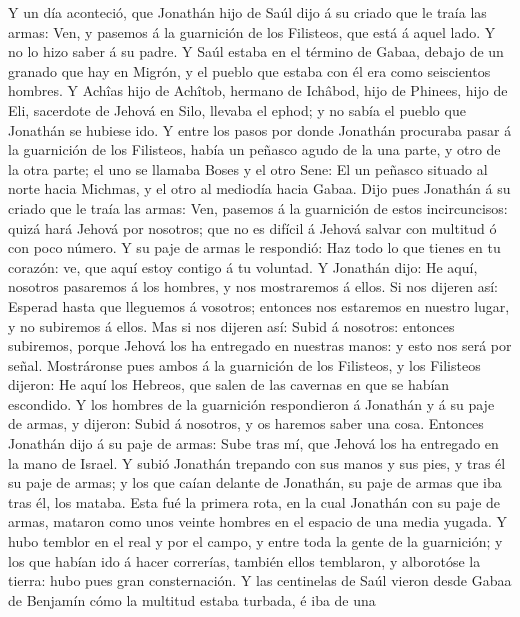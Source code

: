  Y un día aconteció, que Jonathán hijo de Saúl dijo á su
criado que le traía las armas: Ven, y pasemos á la guarnición de los
Filisteos, que está á aquel lado. Y no lo hizo saber á su padre.
 Y Saúl estaba en el término de Gabaa, debajo de un granado
que hay en Migrón, y el pueblo que estaba con él era como seiscientos
hombres.  Y Achîas hijo de Achîtob, hermano de Ichâbod, hijo
de Phinees, hijo de Eli, sacerdote de Jehová en Silo, llevaba el ephod;
y no sabía el pueblo que Jonathán se hubiese ido.  Y entre
los pasos por donde Jonathán procuraba pasar á la guarnición de los
Filisteos, había un peñasco agudo de la una parte, y otro de la otra
parte; el uno se llamaba Boses y el otro Sene:  El un
peñasco situado al norte hacia Michmas, y el otro al mediodía hacia
Gabaa.  Dijo pues Jonathán á su criado que le traía las
armas: Ven, pasemos á la guarnición de estos incircuncisos: quizá hará
Jehová por nosotros; que no es difícil á Jehová salvar con multitud ó
con poco número.  Y su paje de armas le respondió: Haz todo
lo que tienes en tu corazón: ve, que aquí estoy contigo á tu voluntad.
 Y Jonathán dijo: He aquí, nosotros pasaremos á los hombres,
y nos mostraremos á ellos.  Si nos dijeren así: Esperad
hasta que lleguemos á vosotros; entonces nos estaremos en nuestro lugar,
y no subiremos á ellos.  Mas si nos dijeren así: Subid á
nosotros: entonces subiremos, porque Jehová los ha entregado en nuestras
manos: y esto nos será por señal.  Mostráronse pues ambos á
la guarnición de los Filisteos, y los Filisteos dijeron: He aquí los
Hebreos, que salen de las cavernas en que se habían escondido.
 Y los hombres de la guarnición respondieron á Jonathán y á
su paje de armas, y dijeron: Subid á nosotros, y os haremos saber una
cosa. Entonces Jonathán dijo á su paje de armas: Sube tras mí, que
Jehová los ha entregado en la mano de Israel.  Y subió
Jonathán trepando con sus manos y sus pies, y tras él su paje de armas;
y los que caían delante de Jonathán, su paje de armas que iba tras él,
los mataba.  Esta fué la primera rota, en la cual Jonathán
con su paje de armas, mataron como unos veinte hombres en el espacio de
una media yugada.  Y hubo temblor en el real y por el
campo, y entre toda la gente de la guarnición; y los que habían ido á
hacer correrías, también ellos temblaron, y alborotóse la tierra: hubo
pues gran consternación.  Y las centinelas de Saúl vieron
desde Gabaa de Benjamín cómo la multitud estaba turbada, é iba de una
